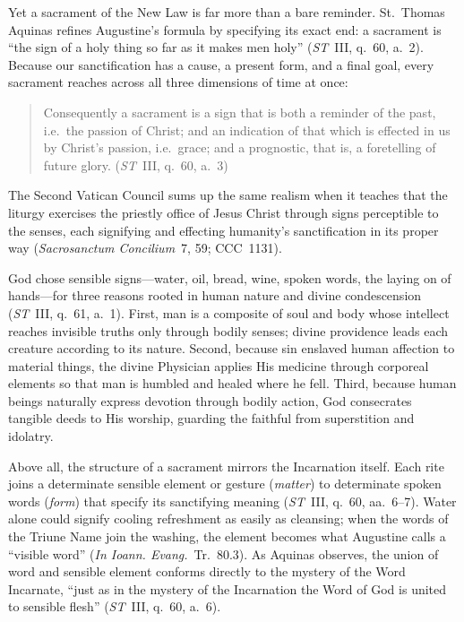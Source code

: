 Yet a sacrament of the New Law is far more than a bare reminder. St.~Thomas Aquinas refines Augustine's formula by specifying its exact end: a sacrament is ``the sign of a holy thing so far as it makes men holy'' (\emph{ST}~III, q.~60, a.~2). Because our sanctification has a cause, a present form, and a final goal, every sacrament reaches across all three dimensions of time at once:
\begin{quotation}
Consequently a sacrament is a sign that is both a reminder of the past, i.e.\ the passion of Christ; and an indication of that which is effected in us by Christ's passion, i.e.\ grace; and a prognostic, that is, a foretelling of future glory. (\emph{ST}~III, q.~60, a.~3)
\end{quotation}
The Second Vatican Council sums up the same realism when it teaches that the liturgy exercises the priestly office of Jesus Christ through signs perceptible to the senses, each signifying and effecting humanity's sanctification in its proper way (\emph{Sacrosanctum Concilium}~7, 59; CCC~1131).

God chose sensible signs---water, oil, bread, wine, spoken words, the laying on of hands---for three reasons rooted in human nature and divine condescension (\emph{ST}~III, q.~61, a.~1). First, man is a composite of soul and body whose intellect reaches invisible truths only through bodily senses; divine providence leads each creature according to its nature. Second, because sin enslaved human affection to material things, the divine Physician applies His medicine through corporeal elements so that man is humbled and healed where he fell. Third, because human beings naturally express devotion through bodily action, God consecrates tangible deeds to His worship, guarding the faithful from superstition and idolatry.

Above all, the structure of a sacrament mirrors the Incarnation itself. Each rite joins a determinate sensible element or gesture (\emph{matter}) to determinate spoken words (\emph{form}) that specify its sanctifying meaning (\emph{ST}~III, q.~60, aa.~6--7). Water alone could signify cooling refreshment as easily as cleansing; when the words of the Triune Name join the washing, the element becomes what Augustine calls a ``visible word'' (\emph{In Ioann. Evang.}~Tr.~80.3). As Aquinas observes, the union of word and sensible element conforms directly to the mystery of the Word Incarnate, ``just as in the mystery of the Incarnation the Word of God is united to sensible flesh'' (\emph{ST}~III, q.~60, a.~6).

